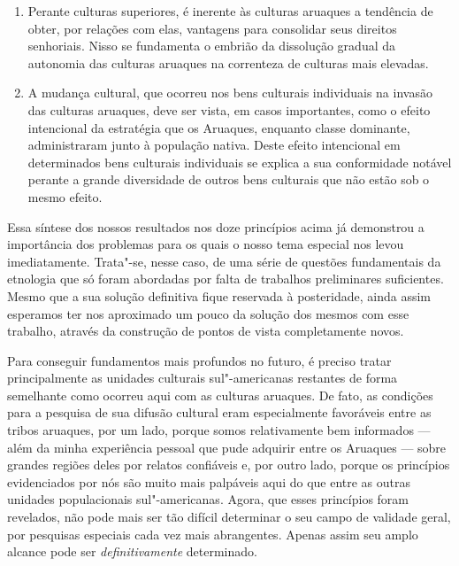 \begin{enumerate}
\item
  Perante culturas superiores, é inerente às culturas aruaques a
  tendência de obter, por relações com elas, vantagens para consolidar
  seus direitos senhoriais. Nisso se fundamenta o embrião da dissolução
  gradual da autonomia das culturas aruaques na correnteza de culturas
  mais elevadas.
\item
  A mudança cultural, que ocorreu nos bens culturais individuais na
  invasão das culturas aruaques, deve ser vista, em casos importantes,
  como o efeito intencional da estratégia que os Aruaques, enquanto
  classe dominante, administraram junto à população nativa. Deste
  efeito intencional em determinados bens culturais individuais se
  explica a sua conformidade notável perante a grande diversidade de
  outros bens culturais que não estão sob o mesmo efeito.
\end{enumerate}

Essa síntese dos nossos resultados nos doze princípios acima já
demonstrou a importância dos problemas para os quais o nosso tema
especial nos levou imediatamente. Trata"-se, nesse caso, de uma série de
questões fundamentais da etnologia que só foram abordadas por
falta de trabalhos preliminares suficientes. Mesmo que a sua solução
definitiva fique reservada à posteridade, ainda assim esperamos ter nos 
aproximado um pouco da solução dos mesmos com esse trabalho, através da
construção de pontos de vista completamente novos.

Para conseguir fundamentos mais profundos no futuro, é preciso tratar
principalmente as unidades culturais sul"-americanas restantes de forma
semelhante como ocorreu aqui com as culturas aruaques. De fato, as
condições para a pesquisa de sua difusão cultural eram especialmente
favoráveis entre as tribos aruaques, por um lado, porque somos
relativamente bem informados --- além da minha experiência pessoal que
pude adquirir entre os Aruaques --- sobre grandes regiões deles por
relatos confiáveis e, por outro lado, porque os princípios evidenciados
por nós são muito mais palpáveis aqui do que entre as outras unidades
populacionais sul"-americanas. Agora, que esses princípios foram
revelados, não pode mais ser tão difícil determinar o seu campo de
validade geral, por pesquisas especiais cada vez mais abrangentes.
Apenas assim seu amplo alcance pode ser \textit{definitivamente} determinado.

